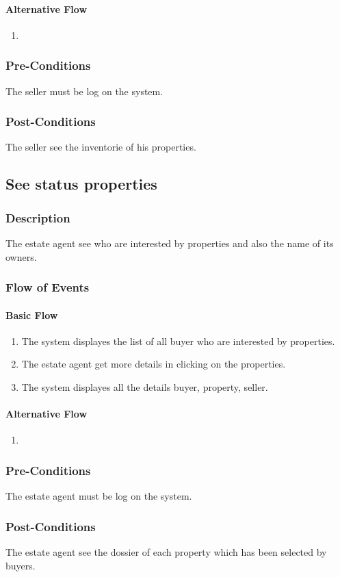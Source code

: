 \documentclass[a4paper,12pt]{article}
\begin{document}
\paragraph{Alternative Flow}
\begin{enumerate}
\item
\end{enumerate}
\subsubsection{Pre-Conditions}
The seller must be log on the system.
\subsubsection{Post-Conditions}
The seller see the inventorie of his properties.

\subsection{See status properties}
\subsubsection{Description}
The estate agent see who are interested by properties and also the name of its owners.
\subsubsection{Flow of Events}
\paragraph{Basic Flow}
\begin{enumerate}
\item The system displayes the list of all buyer who are interested by properties.
\item The estate agent get more details in clicking on the properties.
\item The system displayes all the details buyer, property, seller.
\end{enumerate}
\paragraph{Alternative Flow}
\begin{enumerate}
\item
\end{enumerate}
\subsubsection{Pre-Conditions}
The estate agent must be log on the system.
\subsubsection{Post-Conditions}
The estate agent see the dossier of each property which has been selected by buyers.
\end{document}
